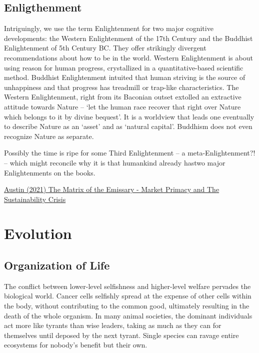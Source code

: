 \documentclass[
]{book}
\begin{document}
\hypertarget{enligthenment}{%
\section{Enligthenment}\label{enligthenment}}

Intriguingly, we use the term Enlightenment for two major cognitive developments: the Western Enlightenment of the 17th Century and the Buddhist Enlightenment of 5th Century BC. They offer strikingly divergent recommendations about how to be in the world. Western Enlightenment is about using reason for human progress, crystallized in a quantitative-based scientific method. Buddhist Enlightenment intuited that human striving is the source of unhappiness and that progress has treadmill or trap-like characteristics. The Western Enlightenment, right from its Baconian outset extolled an extractive attitude towards Nature -- `let the human race recover that right over Nature which belongs to it by divine bequest'. It is a worldview that leads one eventually to describe Nature as an `asset' and as `natural capital'. Buddhism does not even recognize Nature as separate.

Possibly the time is ripe for some Third Enlightenment -- a meta-Enlightenment?! -- which might reconcile why it is that humankind already hastwo major Enlightenments on the books.

\href{https://channelmcgilchrist.com/articles/the-matrix-of-the-emissary/}{Austin (2021) The Matrix of the Emissary - Market Primacy and The Sustainability Crisis}

\hypertarget{evolution}{%
\chapter{Evolution}\label{evolution}}

\hypertarget{organization-of-life}{%
\section{Organization of Life}\label{organization-of-life}}

The conflict between lower-level selfishness and higher-level welfare pervades the biological world. Cancer cells selfishly spread at the expense of other cells within the body, without contributing to the common good, ultimately resulting in the death of the whole organism. In many animal societies, the dominant individuals act more like tyrants than wise leaders, taking as much as they can for themselves until deposed by the next tyrant. Single species can ravage entire ecosystems for nobody's benefit but their own.
\end{document}
